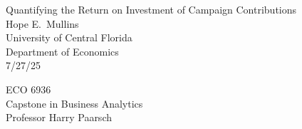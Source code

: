 \documentclass[12pt]{article}
\begin{document}
\begin{titlepage}
	\centering
	\vspace*{1in}

	{\LARGE Quantifying the Return on Investment of Campaign Contributions}\\[1.5cm]
	{\large Hope E.\ Mullins}\\[.5cm]
	{\large University of Central Florida}\\[.5cm]
	{\large Department of Economics}\\[.5cm]
	{\large 7/27/25}

	\vfill
	{\large ECO 6936}\\[.5cm]
	{\large	Capstone in Business Analytics}\\[.5cm]
	{\large Professor Harry Paarsch}\\[1cm]
\end{titlepage}


\doublespacing

\newpage













\nocite{*}


\end{document}
